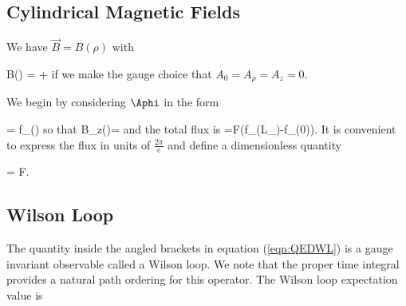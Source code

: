 \subsection{Cylindrical Magnetic Fields} 

We have $\vec{B} =
B(\rho)$ with

\be \label{eqn:BWLN} B(\rho) =  +
 \ee if we make the gauge choice that $A_0 =
A_\rho = A_z = 0$.

We begin by considering $\Aphi$ in the form

\be \Aphi = f_\lambda(\rho) \ee so that \be
B_z(\rho)= \ee and the total
flux is \be \Phi=F(f_\lambda(L_\rho)-f_\lambda(0)).  \ee It is convenient
to express the flux in units of $\frac{2 \pi}{e}$ and define a dimensionless
quantity

\be 
	= F.
\ee







\subsection{Wilson Loop}

The quantity inside the angled brackets in equation (\ref{eqn:QEDWL}) is a 
gauge invariant observable called a Wilson loop. We note that the proper time
integral provides a natural path ordering for this operator.
The Wilson loop expectation value is

